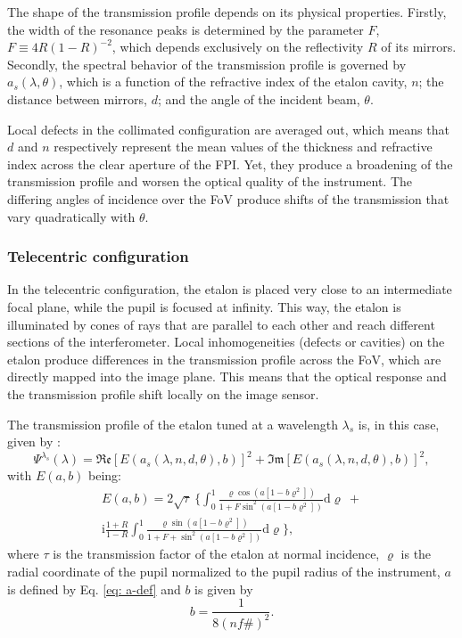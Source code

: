 \documentclass[12pt]{mythesis}
\begin{document}
The shape of the transmission profile depends on its physical properties. Firstly, the width of the resonance peaks is determined by the parameter $F$, $F \equiv 4R (1 - R )^{-2}$, which depends exclusively on the reflectivity $R$ of its mirrors. Secondly, the spectral behavior of the transmission profile is governed by $a_s(\lambda,\theta)$, which is a function of the refractive index of the etalon cavity, $n$; the distance between mirrors, $d$; and the angle of the incident beam, $\theta$. 

Local defects in the collimated configuration are averaged out, which means that $d$ and $n$ respectively represent the mean values of the thickness and refractive index across the clear aperture of the FPI. Yet, they produce a broadening of the transmission profile and worsen the optical quality of the instrument. The differing angles of incidence over the FoV produce shifts of the transmission that vary quadratically with $\theta$.

\subsubsection{Telecentric configuration}

In the telecentric configuration, the etalon is placed very close to an intermediate focal plane, while the pupil is focused at infinity. This way, the etalon is illuminated by cones of rays that are parallel to each other and reach different sections of the interferometer. Local inhomogeneities (defects or cavities) on the etalon produce differences in the transmission profile across the FoV, which are directly mapped into the image plane. This means that the optical response and the transmission profile shift locally on the image sensor. 

The transmission profile of the etalon tuned at a wavelength $\lambda _s $ is, in this case, given by \citep{franIV}:
\begin{equation}
\Psi ^{\lambda _ s} (\lambda) =  \mathfrak{Re}\left[E(a_s (\lambda, n, d, \theta), b) \right] ^2 + \mathfrak{Im}\left[E(a_s(\lambda, n, d, \theta), b) \right] ^2 ,
\label{Eqn: Tel_first}
\end{equation}
with $E(a,b)$ being:
\begin{multline}
E(a, b) = 2 \sqrt{\tau}\ \Biggl\{ \int_0^1 \frac{\varrho \cos \left(a\left[1-b \varrho^2\right]\right)}{1+F \sin ^2\left(a\left[1-b \varrho^2\right]\right)} \mathrm{d} \varrho \ + \\
\mathrm{i} \frac{1+R}{1-R} \int_0^1 \frac{\varrho \sin \left(a\left[1-b \varrho^2\right]\right)}{1+F+ \sin ^2\left(a\left[1-b \varrho^2\right]\right)} \mathrm{d} \varrho\Biggr\} ,
\end{multline}
where $\tau$ is the transmission factor of the etalon at normal incidence, $\varrho$ is the radial coordinate of the pupil normalized to the pupil radius of the instrument, $a$ is defined by Eq. \eqref{eq: a-def} and $b$ is given by
\begin{equation}
b = \frac{1}{8 (nf\#) ^2}.
\end{equation}
\end{document}
